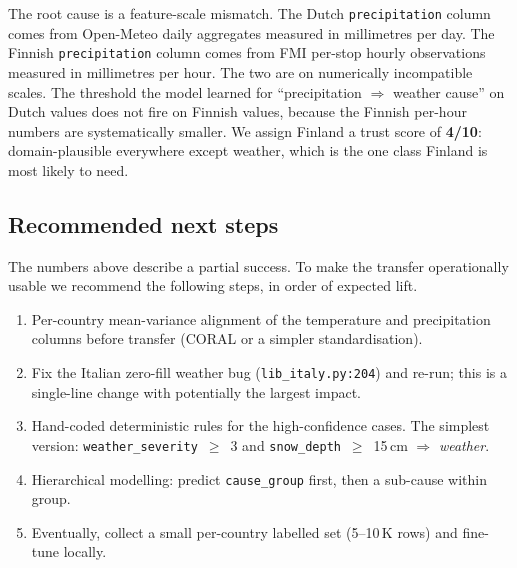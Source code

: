 The root cause is a feature-scale mismatch. The Dutch \texttt{precipitation} column comes from Open-Meteo daily aggregates measured in millimetres per day. The Finnish \texttt{precipitation} column comes from FMI per-stop hourly observations measured in millimetres per hour. The two are on numerically incompatible scales. The threshold the model learned for ``precipitation $\Rightarrow$ weather cause'' on Dutch values does not fire on Finnish values, because the Finnish per-hour numbers are systematically smaller. We assign Finland a trust score of \textbf{4/10}: domain-plausible everywhere except weather, which is the one class Finland is most likely to need.

\subsection{Recommended next steps}

The numbers above describe a partial success. To make the transfer operationally usable we recommend the following steps, in order of expected lift.

\begin{enumerate}
    \item Per-country mean-variance alignment of the temperature and precipitation columns before transfer (CORAL or a simpler standardisation).
    \item Fix the Italian zero-fill weather bug (\texttt{lib\_italy.py:204}) and re-run; this is a single-line change with potentially the largest impact.
    \item Hand-coded deterministic rules for the high-confidence cases. The simplest version: \texttt{weather\_severity}~$\geq$~3 and \texttt{snow\_depth}~$\geq$~15\,cm $\Rightarrow$ \emph{weather}.
    \item Hierarchical modelling: predict \texttt{cause\_group} first, then a sub-cause within group.
    \item Eventually, collect a small per-country labelled set (5--10\,K rows) and fine-tune locally.
\end{enumerate}
